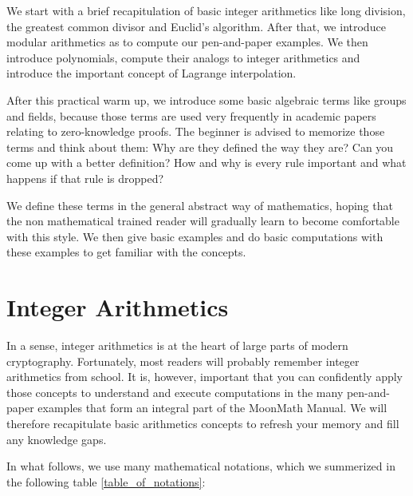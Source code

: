 We start with a brief recapitulation of basic integer arithmetics like long division, the greatest common divisor and Euclid's algorithm. After that, we introduce modular arithmetics as   to compute our pen-and-paper examples. We then introduce polynomials, compute their analogs to integer arithmetics and introduce the important concept of Lagrange interpolation.

After this practical warm up, we introduce some basic algebraic terms like groups and fields, because those terms are used very frequently in academic papers relating to zero-knowledge proofs. The beginner is advised to memorize those terms and think about them: Why are they defined the way they are? Can you come up with a better definition? How and why is every rule important and what happens if that rule is dropped? 

We define these terms in the general abstract way of mathematics, hoping that the non mathematical trained reader will gradually learn to become comfortable with this style. We then give basic examples and do basic computations with these examples to get familiar with the concepts. 

\section{Integer Arithmetics}
\label{integer_arithmetics}
In a sense, integer arithmetics is at the heart of large parts of modern cryptography. Fortunately, most readers will probably remember integer arithmetics from school. It is, however, important that you can confidently apply those concepts to understand and execute computations in the many pen-and-paper examples that form an integral part of the MoonMath Manual. We will therefore recapitulate basic arithmetics concepts to refresh your memory and fill any knowledge gaps.

In what follows, we use many mathematical notations, which we summerized in the following table \ref{table_of_notations}:

